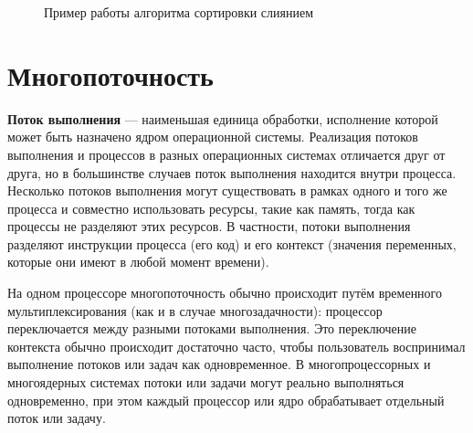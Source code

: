 \documentclass[12pt]{report}
\begin{document}
\begin{figure}[h]
	\caption{Пример работы алгоритма сортировки слиянием}
	\label{figure:image}
\end{figure}

\section{Многопоточность}

\hspace{0.6cm} \textbf {Поток выполнения} — наименьшая единица обработки, исполнение которой может быть назначено ядром операционной системы. Реализация потоков выполнения и процессов в разных операционных системах отличается друг от друга, но в большинстве случаев поток выполнения находится внутри процесса. Несколько потоков выполнения могут существовать в рамках одного и того же процесса и совместно использовать ресурсы, такие как память, тогда как процессы не разделяют этих ресурсов. В частности, потоки выполнения разделяют инструкции процесса (его код) и его контекст (значения переменных, которые они имеют в любой момент времени).

На одном процессоре многопоточность обычно происходит путём временного мультиплексирования (как и в случае многозадачности): процессор переключается между разными потоками выполнения. Это переключение контекста обычно происходит достаточно часто, чтобы пользователь воспринимал выполнение потоков или задач как одновременное. В многопроцессорных и многоядерных системах потоки или задачи могут реально выполняться одновременно, при этом каждый процессор или ядро обрабатывает отдельный поток или задачу.
\end{document}
